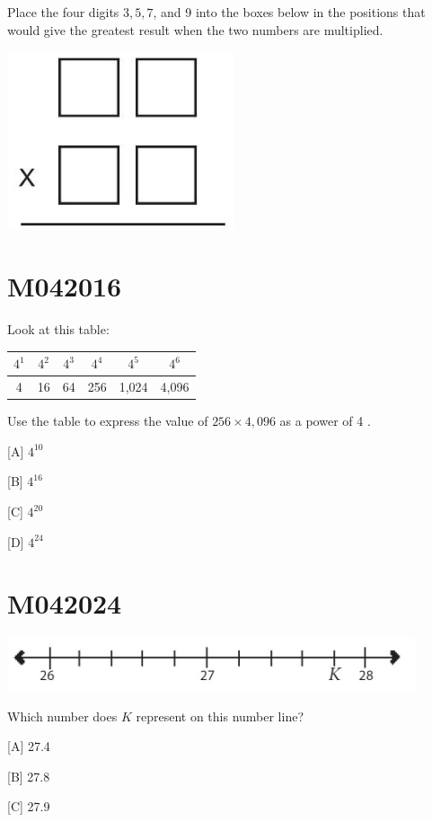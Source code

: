 \documentclass[12pt]{article}
\begin{document}
Place the four digits $3,5,7$, and 9 into the boxes below in the positions that would give the greatest result when the two numbers are multiplied.

\includegraphics[max width=0.5\textwidth]{2024_02_20_828ebc9d68bcc1fbb223g-08}

\newpage
\section*{M042016}

Look at this table:


\begin{tabular}{|c|c|c|c|c|c|}
\hline
$4^{1}$ & $4^{2}$ & $4^{3}$ & $4^{4}$ & $4^{5}$ & $4^{6}$ \\
\hline
4 & 16 & 64 & 256 & 1,024 & 4,096 \\
\hline
\end{tabular}


Use the table to express the value of $256 \times 4,096$ as a power of 4 .

[A] $4^{10}$

[B] $4^{16}$

[C] $4^{20}$

[D] $4^{24}$

\newpage
\section*{M042024}

\includegraphics[max width=0.9\textwidth]{2024_02_20_828ebc9d68bcc1fbb223g-10}

Which number does $K$ represent on this number line?

[A] 27.4

[B] 27.8

[C] 27.9
\end{document}
